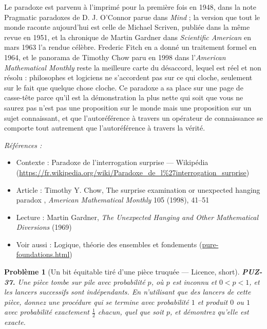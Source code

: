 \documentclass[11pt]{article}
\newtheorem{problem}{Problème}
\newenvironment{refs}{\par\small\noindent\emph{Références :}\begin{itemize}\setlength\itemsep{0pt}}{\end{itemize}\normalsize}
\begin{document}
\noindent Le paradoxe est parvenu à l'imprimé pour la première fois en 1948, dans
la note \og{} Pragmatic paradoxes \fg{} de D. J. O'Connor parue dans \textit{Mind} ; la version que
tout le monde raconte aujourd'hui est celle de Michael Scriven, publiée dans la même revue en
1951, et la chronique de Martin Gardner dans \textit{Scientific American} en mars 1963 l'a
rendue célèbre. Frederic Fitch en a donné un traitement formel en 1964, et le panorama de
Timothy Chow paru en 1998 dans l'\textit{American Mathematical Monthly} reste la meilleure
carte du désaccord, lequel est réel et non résolu : philosophes et logiciens ne s'accordent
pas sur ce qui cloche, seulement sur le fait que quelque chose cloche. Ce paradoxe a sa place
sur une page de casse-tête parce qu'il est la démonstration la plus nette qui soit que \og{} vous
ne saurez pas \fg{} n'est pas une proposition sur le monde mais une proposition sur un sujet
connaissant, et que l'autoréférence à travers un opérateur de connaissance se comporte tout
autrement que l'autoréférence à travers la vérité.

\begin{refs}
\item Contexte : Paradoxe de l'interrogation surprise --- Wikipédia (\url{https://fr.wikipedia.org/wiki/Paradoxe_de_l%27interrogation_surprise})
\item Article : Timothy Y. Chow, \og{} The surprise examination or unexpected hanging paradox \fg{}, \textit{American Mathematical Monthly} 105 (1998), 41--51
\item Lecture : Martin Gardner, \textit{The Unexpected Hanging and Other Mathematical Diversions} (1969)
\item Voir aussi : Logique, théorie des ensembles et fondements (\url{pure-foundations.html})
\end{refs}

\bigskip

\begin{problem}[{Un bit équitable tiré d'une pièce truquée --- Licence, short}]
\textbf{PUZ-37.} Une pièce tombe sur pile avec probabilité $ p $, où
$ p $ est inconnu et $ 0 < p < 1 $, et les lancers successifs sont indépendants. En
n'utilisant que des lancers de cette pièce, donnez une procédure qui se termine avec
probabilité $ 1 $ et produit $ 0 $ ou $ 1 $ avec probabilité exactement
$ \tfrac{1}{2} $ chacun, quel que soit $ p $, et démontrez qu'elle est exacte.
\end{problem}
\end{document}
